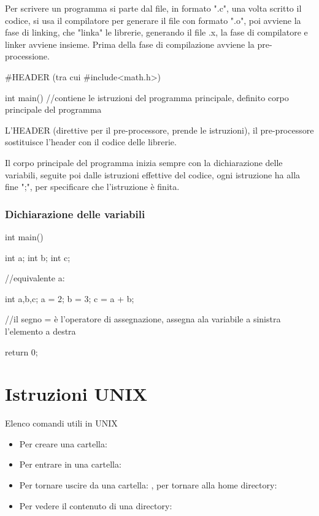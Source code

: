 \documentclass[a4paper,12pt]{article}
\begin{document}
	Per scrivere un programma si parte dal file, in formato ".c", una volta scritto il codice, si usa il compilatore per generare il file con formato  ".o", poi avviene la fase di linking, che "linka" le librerie, generando il file .x, la fase di compilatore e linker avviene insieme.
	Prima della fase di compilazione avviene la pre-processione.
	
	\begin{code} 
#HEADER (tra cui #include<math.h>)

int main(){
	//contiene le istruzioni del programma principale, definito corpo principale del programma
}
	\end{code}
	
	L'HEADER (direttive per il pre-processore, prende le istruzioni), il pre-processore sostituisce l'header con il codice delle librerie.
	
	Il corpo principale del programma inizia sempre con la dichiarazione delle variabili, seguite poi dalle istruzioni effettive del codice, ogni istruzione ha alla fine ";", per specificare che l'istruzione è finita.
	\subsubsection{Dichiarazione delle variabili}
	\begin{code}
int main(){
	int a;
	int b;
	int c;
	
	//equivalente a:
	
	int a,b,c;
	a = 2;
	b = 3;
	c = a + b;
	
	//il segno = è l'operatore di assegnazione, assegna ala variabile a sinistra l'elemento a destra
	
	return 0;
}
	\end{code}
	\newpage
	
	\section{Istruzioni UNIX}
	Elenco comandi utili in UNIX
	\begin{itemize}
		\item Per creare una cartella: 
		\item Per entrare in una cartella: 
		\item Per tornare uscire da una cartella: , per tornare alla home directory: 
		\item Per vedere il contenuto di una directory: 
	\end{itemize}
\end{document}
